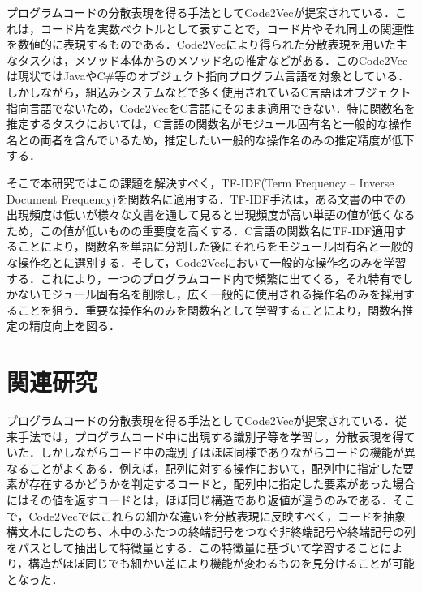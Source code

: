 \documentclass[submit,techrep,noauthor]{ipsj}
\begin{document}
プログラムコードの分散表現を得る手法としてCode2Vec\cite{alon2019code2vec}が提案されている．これは，コード片を実数ベクトルとして表すことで，コード片やそれ同士の関連性を数値的に表現するものである．Code2Vecにより得られた分散表現を用いた主なタスクは，メソッド本体からのメソッド名の推定などがある．このCode2Vecは現状ではJavaやC\#等のオブジェクト指向プログラム言語を対象としている．しかしながら，組込みシステムなどで多く使用されているC言語はオブジェクト指向言語でないため，Code2VecをC言語にそのまま適用できない．特に関数名を推定するタスクにおいては，C言語の関数名がモジュール固有名と一般的な操作名との両者を含んでいるため，推定したい一般的な操作名のみの推定精度が低下する．

そこで本研究ではこの課題を解決すべく，TF-IDF(Term Frequency – Inverse Document Frequency)\cite{ramos2003using}を関数名に適用する．TF-IDF手法は，ある文書の中での出現頻度は低いが様々な文書を通して見ると出現頻度が高い単語の値が低くなるため，この値が低いものの重要度を高くする．C言語の関数名にTF-IDF適用することにより，関数名を単語に分割した後にそれらをモジュール固有名と一般的な操作名とに選別する．そして，Code2Vecにおいて一般的な操作名のみを学習する．これにより，一つのプログラムコード内で頻繁に出てくる，それ特有でしかないモジュール固有名を削除し，広く一般的に使用される操作名のみを採用することを狙う．重要な操作名のみを関数名として学習することにより，関数名推定の精度向上を図る．




\section{関連研究}

プログラムコードの分散表現を得る手法としてCode2Vec\cite{alon2019code2vec}が提案されている．従来手法では，プログラムコード中に出現する識別子等を学習し，分散表現を得ていた．しかしながらコード中の識別子はほぼ同様でありながらコードの機能が異なることがよくある．例えば，配列に対する操作において，配列中に指定した要素が存在するかどうかを判定するコードと，配列中に指定した要素があった場合にはその値を返すコードとは，ほぼ同じ構造であり返値が違うのみである．そこで，Code2Vecではこれらの細かな違いを分散表現に反映すべく，コードを抽象構文木にしたのち、木中のふたつの終端記号をつなぐ非終端記号や終端記号の列をパスとして抽出して特徴量とする．この特徴量に基づいて学習することにより，構造がほぼ同じでも細かい差により機能が変わるものを見分けることが可能となった．
\end{document}
